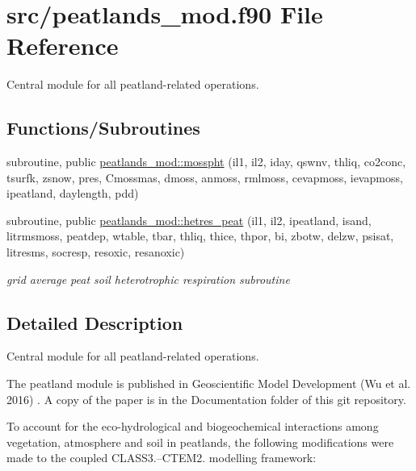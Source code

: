 \hypertarget{peatlands__mod_8f90}{}\section{src/peatlands\+\_\+mod.f90 File Reference}
\label{peatlands__mod_8f90}


Central module for all peatland-\/related operations.  


\subsection*{Functions/\+Subroutines}
{\bf }\par
\begin{DoxyCompactItemize}
\item 
subroutine, public \hyperlink{group__moss__photosynthesis_ga74c6ae528153d57336622db389f4bdd3}{peatlands\+\_\+mod\+::mosspht} (il1, il2, iday, qswnv, thliq, co2conc, tsurfk, zsnow, pres, Cmossmas, dmoss, anmoss, rmlmoss, cevapmoss, ievapmoss, ipeatland, daylength, pdd)
\end{DoxyCompactItemize}

{\bf }\par
\begin{DoxyCompactItemize}
\item 
subroutine, public \hyperlink{group__peat__soil__het__resp_gaed12b76ec8925a4bc3105f8ae7a36888}{peatlands\+\_\+mod\+::hetres\+\_\+peat} (il1, il2, ipeatland, isand, litrmsmoss, peatdep, wtable, tbar, thliq, thice, thpor, bi, zbotw, delzw, psisat, litresms, socresp, resoxic, resanoxic)
\begin{DoxyCompactList}\small\item\em grid average peat soil heterotrophic respiration subroutine \end{DoxyCompactList}\end{DoxyCompactItemize}



\subsection{Detailed Description}
Central module for all peatland-\/related operations. 

The peatland module is published in Geoscientific Model Development (Wu et al. 2016) \cite{Wu2016-zt}. A copy of the paper is in the Documentation folder of this git repository. 

 To account for the eco-\/hydrological and biogeochemical interactions among vegetation, atmosphere and soil in peatlands, the following modifications were made to the coupled C\+L\+A\+S\+S3.--C\+T\+E\+M2. modelling framework\+:


